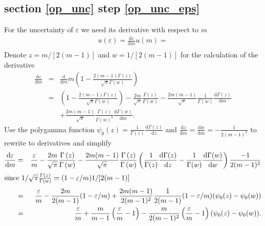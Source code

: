  \subsection{section \ref{op_unc}  step \ref{op_unc_eps}}
For the uncertainty of $\varepsilon$ we need its derivative with respect to $m$
\begin{eqnarray*}
  u(\varepsilon) = \frac{\mathrm{d} \varepsilon}{ \mathrm{d} m} u(m) = \\
  \end{eqnarray*}
  Denote $z = m/[2(m-1)]$ and $w = 1/[2(m-1)]$ for the calculation of the derivative
  \begin{eqnarray*}
   \frac{\mathrm{d} \varepsilon}{\mathrm{d} m} &=& \frac{\mathrm{d} }{\mathrm{d} m} m \left(1-\frac{2(m-1) \Gamma\left(z\right)}{\sqrt{\pi}\Gamma\left(w\right)} \right) \\
   &=& \left(1-\frac{2(m-1) \Gamma\left(z\right)}{\sqrt{\pi}\Gamma\left(w\right)} \right)   
       - \frac{2m}{\sqrt{\pi}}  \frac{\Gamma\left(z\right)}{\Gamma\left(w\right)}
       - \frac{2m(m-1)}{\sqrt{\pi}} \frac{1}{\Gamma \left( w \right)} \frac{\mathrm{d} \Gamma(z)}{\mathrm{d} m} \\
       && + \frac{2m(m-1)}{\sqrt{\pi}} \frac{ \Gamma \left(z\right)  }{\Gamma \left( w \right)^2} \frac{\mathrm{d} \Gamma(w)}{\mathrm{d} m}.
       \end{eqnarray*}
       Use the polygamma function $\psi_0(z) = \frac{1}{\Gamma(z)} \frac{\mathrm{d} \Gamma(z)}{ \mathrm{d} z}$ and $\frac{\mathrm{d} z}{\mathrm{d} m} = \frac{\mathrm{d} w}{\mathrm{d} m} = -\frac{1}{2 (m-1)^2}$ to rewrite to derivatives and simplify
  \begin{eqnarray*}
  \frac{\mathrm{d} \varepsilon}{\mathrm{d} m} &= & 
  \frac{\varepsilon}{m}
  - \frac{2m}{\sqrt{\pi}}  \frac{\Gamma\left(z\right)}{\Gamma\left(w\right)}
       - \frac{2m(m-1)}{\sqrt{\pi}} \frac{\Gamma\left(z\right)}{\Gamma \left( w \right)} \left(\frac{1}{\Gamma(z)} \frac{\mathrm{d} \Gamma(z)}{\mathrm{d} z} - \frac{1}{\Gamma(w)}\frac{\mathrm{d} \Gamma(w)}{\mathrm{d} w} \right) \frac{-1}{2(m-1)^2}\\   
       \shortintertext{since $ 1/\sqrt{\pi} \frac{\Gamma\left(z\right)}{\Gamma \left( w \right)} = (1- \varepsilon/m) 1/[2(m-1)]$ } 
       &=&  \frac{\varepsilon}{m} - \frac{2m }{2(m-1)}(1- \varepsilon/m)  + \frac{2m(m-1)}{2(m-1)^2} \frac1{2(m-1)} (1- \varepsilon/m)  (\psi_0(z)-\psi_0(w)) \\
         &= &\frac{\varepsilon}{m} + \frac{m}{m -1} \left(\frac{\varepsilon}{m} -1\right) - \frac{m}{2(m-1)^2}\left(\frac{\varepsilon}{m} -1\right) (\psi_0(z)-\psi_0(w)).
 \end{eqnarray*}
 
